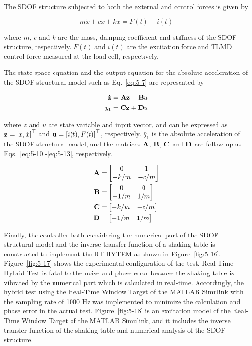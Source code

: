 The SDOF structure subjected to both the external and control forces is given by

\begin{equation}\label{eq:5-7}
m\ddot{x}+c\dot{x}+kx = F(t) - i(t)
\end{equation}

where $m$, $c$ and $k$ are the mass, damping coefficient and stiffness of the SDOF structure, respectively. $F(t)$ and $i(t)$ are the excitation force and TLMD control force measured at the load cell, respectively.

The state-space equation and the output equation for the absolute acceleration of the SDOF structural model such as Eq.~\eqref{eq:5-7} are represented by

\begin{align}
\dot{\mathbf{z}}&=\mathbf{A}\mathbf{z}+\mathbf{B}u \label{eq:5-8} \\
\bar{y_{1}}&=\mathbf{C}\mathbf{z} + \mathbf{D}u \label{eq:5-9}
\end{align}

where $z$ and $u$ are state variable and input vector, and can be expressed as $\mathbf{z}=\left[x, \dot{x}\right]^{\top}$ and $\mathbf{u} = \left[i(t), F(t)\right]^{\top}$, respectively. $\bar{y}_{1}$ is the absolute acceleration of the SDOF structural model, and the matrices $\mathbf{A}$, $\mathbf{B}$, $\mathbf{C}$ and $\mathbf{D}$ are follow-up as Eqs.~\eqref{eq:5-10}-\eqref{eq:5-13}, respectively.

\begin{align}
\mathbf{A}&=\begin{bmatrix} 0 & 1 \\ -k/m & -c/m \end{bmatrix} \label{eq:5-10} \\
\mathbf{B}&=\begin{bmatrix} 0 & 0 \\ -1/m & 1/m \end{bmatrix} \label{eq:5-11} \\
\mathbf{C}&=\begin{bmatrix} -k/m & -c/m \end{bmatrix} \label{eq:5-12} \\
\mathbf{D}&=\begin{bmatrix} -1/m & 1/m \end{bmatrix} \label{eq:5-13}
\end{align}

Finally, the controller both considering the numerical part of the SDOF structural model and the inverse transfer function of a shaking table is constructed to implement the RT-HYTEM as shown in Figure~\ref{fig:5-16}. Figure~\ref{fig:5-17} shows the experimental configuration of the test. Real-Time Hybrid Test is fatal to the noise and phase error because the shaking table is vibrated by the numerical part which is calculated in real-time. Accordingly, the hybrid test using the Real-Time Window Target of the MATLAB Simulink with the sampling rate of 1000 Hz was implemented to minimize the calculation and phase error in the actual test. Figure~\ref{fig:5-18} is an excitation model of the Real-Time Window Target of the MATLAB Simulink, and it includes the inverse transfer function of the shaking table and numerical analysis of the SDOF structure.

